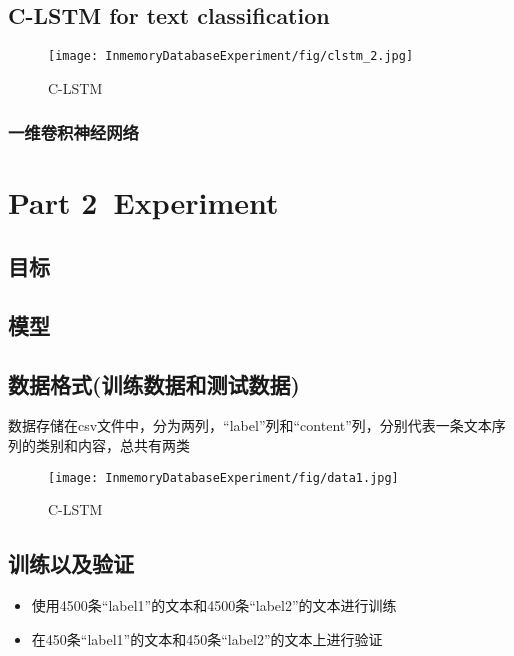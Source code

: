 \section{C-LSTM for text classification}


\begin{figure}[H]
	\centering
	\texttt{[image: InmemoryDatabaseExperiment/fig/clstm\_2.jpg]}
	\caption{C-LSTM}
\end{figure}

\subsection{一维卷积神经网络}





\chapter{Part 2\  Experiment}

\section{目标}
\section{模型}
\section{数据格式(训练数据和测试数据)}
数据存储在csv文件中，分为两列，“label”列和“content”列，分别代表一条文本序列的类别和内容，总共有两类

\begin{figure}[H]
	\centering
	\texttt{[image: InmemoryDatabaseExperiment/fig/data1.jpg]}
	\caption{C-LSTM}
\end{figure}

\section{训练以及验证}
\begin{itemize}
    \item 使用4500条“label1”的文本和4500条“label2”的文本进行训练
    \item 在450条“label1”的文本和450条“label2”的文本上进行验证
\end{itemize}

